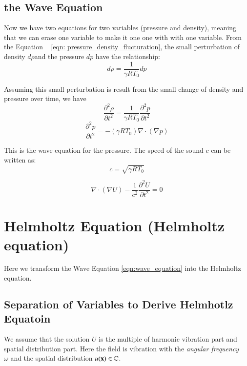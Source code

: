 \subsection{the Wave Equation}
%
Now we have two equations for two variables (pressure and density), meaning that we can erase one variable to make it one one with with one variable.
%
From the Equation ~ \eqref{eqn: pressure_density_flucturation}, the small perturbation of density $d\rho$and the pressure $dp$ have the relationship:
%
\begin{equation}
d\rho = \frac{1}{\gamma RT_0} dp
\end{equation}

Assuming this small perturbation is result from the small change of density and pressure over time, we have
%
\begin{equation}
\frac{\partial^2 \rho}{\partial t^2} = \frac{1}{\gamma RT_0} \frac{\partial^2 p}{\partial t^2}
\end{equation}
%
\begin{equation}
\frac{\partial^2 p}{\partial t^2} = -(\gamma RT_0) \nabla\cdot(\nabla p)
\end{equation}

This is the wave equation for the pressure.
%
The speed of the sound $c$ can be written as:
\begin{equation}
c = \sqrt{\gamma RT_0 }
\end{equation}




\begin{tcolorbox}[title=Wave Equation]
\begin{equation}
\nabla\cdot(\nabla U) - \frac{1}{c^2} \frac{\partial^2 U}{\partial t^2} =  0
\label{eqn:wave_equation}
\end{equation}
\end{tcolorbox}


\section{Helmholtz Equation (Helmholtz equation)}

Here we transform the Wave Equation \eqref{eqn:wave_equation} into the Helmholtz equation.

\subsection{Separation of Variables to Derive Helmhotlz Equatoin}

We assume that the solution $U$ is the multiple of harmonic vibration part and spatial distribution part.
%
Here the field is vibration with the \textit{angular frequency} ~ $\omega$ and the spatial distribution $u(\mathbf{x})\in\mathbb{C}$.

